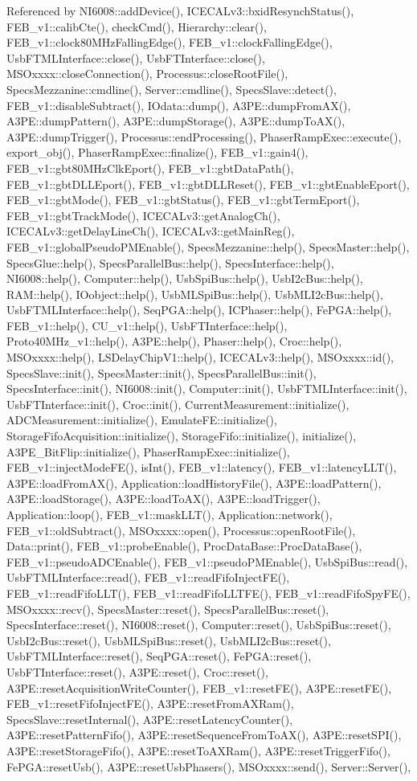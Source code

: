 Referenced by NI6008::addDevice(), ICECALv3::bxidResynchStatus(), FEB\_\-v1::calibCte(), checkCmd(), Hierarchy::clear(), FEB\_\-v1::clock80MHzFallingEdge(), FEB\_\-v1::clockFallingEdge(), UsbFTMLInterface::close(), UsbFTInterface::close(), MSOxxxx::closeConnection(), Processus::closeRootFile(), SpecsMezzanine::cmdline(), Server::cmdline(), SpecsSlave::detect(), FEB\_\-v1::disableSubtract(), IOdata::dump(), A3PE::dumpFromAX(), A3PE::dumpPattern(), A3PE::dumpStorage(), A3PE::dumpToAX(), A3PE::dumpTrigger(), Processus::endProcessing(), PhaserRampExec::execute(), export\_\-obj(), PhaserRampExec::finalize(), FEB\_\-v1::gain4(), FEB\_\-v1::gbt80MHzClkEport(), FEB\_\-v1::gbtDataPath(), FEB\_\-v1::gbtDLLEport(), FEB\_\-v1::gbtDLLReset(), FEB\_\-v1::gbtEnableEport(), FEB\_\-v1::gbtMode(), FEB\_\-v1::gbtStatus(), FEB\_\-v1::gbtTermEport(), FEB\_\-v1::gbtTrackMode(), ICECALv3::getAnalogCh(), ICECALv3::getDelayLineCh(), ICECALv3::getMainReg(), FEB\_\-v1::globalPseudoPMEnable(), SpecsMezzanine::help(), SpecsMaster::help(), SpecsGlue::help(), SpecsParallelBus::help(), SpecsInterface::help(), NI6008::help(), Computer::help(), UsbSpiBus::help(), UsbI2cBus::help(), RAM::help(), IOobject::help(), UsbMLSpiBus::help(), UsbMLI2cBus::help(), UsbFTMLInterface::help(), SeqPGA::help(), ICPhaser::help(), FePGA::help(), FEB\_\-v1::help(), CU\_\-v1::help(), UsbFTInterface::help(), Proto40MHz\_\-v1::help(), A3PE::help(), Phaser::help(), Croc::help(), MSOxxxx::help(), LSDelayChipV1::help(), ICECALv3::help(), MSOxxxx::id(), SpecsSlave::init(), SpecsMaster::init(), SpecsParallelBus::init(), SpecsInterface::init(), NI6008::init(), Computer::init(), UsbFTMLInterface::init(), UsbFTInterface::init(), Croc::init(), CurrentMeasurement::initialize(), ADCMeasurement::initialize(), EmulateFE::initialize(), StorageFifoAcquisition::initialize(), StorageFifo::initialize(), initialize(), A3PE\_\-BitFlip::initialize(), PhaserRampExec::initialize(), FEB\_\-v1::injectModeFE(), isInt(), FEB\_\-v1::latency(), FEB\_\-v1::latencyLLT(), A3PE::loadFromAX(), Application::loadHistoryFile(), A3PE::loadPattern(), A3PE::loadStorage(), A3PE::loadToAX(), A3PE::loadTrigger(), Application::loop(), FEB\_\-v1::maskLLT(), Application::network(), FEB\_\-v1::oldSubtract(), MSOxxxx::open(), Processus::openRootFile(), Data::print(), FEB\_\-v1::probeEnable(), ProcDataBase::ProcDataBase(), FEB\_\-v1::pseudoADCEnable(), FEB\_\-v1::pseudoPMEnable(), UsbSpiBus::read(), UsbFTMLInterface::read(), FEB\_\-v1::readFifoInjectFE(), FEB\_\-v1::readFifoLLT(), FEB\_\-v1::readFifoLLTFE(), FEB\_\-v1::readFifoSpyFE(), MSOxxxx::recv(), SpecsMaster::reset(), SpecsParallelBus::reset(), SpecsInterface::reset(), NI6008::reset(), Computer::reset(), UsbSpiBus::reset(), UsbI2cBus::reset(), UsbMLSpiBus::reset(), UsbMLI2cBus::reset(), UsbFTMLInterface::reset(), SeqPGA::reset(), FePGA::reset(), UsbFTInterface::reset(), A3PE::reset(), Croc::reset(), A3PE::resetAcquisitionWriteCounter(), FEB\_\-v1::resetFE(), A3PE::resetFE(), FEB\_\-v1::resetFifoInjectFE(), A3PE::resetFromAXRam(), SpecsSlave::resetInternal(), A3PE::resetLatencyCounter(), A3PE::resetPatternFifo(), A3PE::resetSequenceFromToAX(), A3PE::resetSPI(), A3PE::resetStorageFifo(), A3PE::resetToAXRam(), A3PE::resetTriggerFifo(), FePGA::resetUsb(), A3PE::resetUsbPhasers(), MSOxxxx::send(), Server::Server(), 